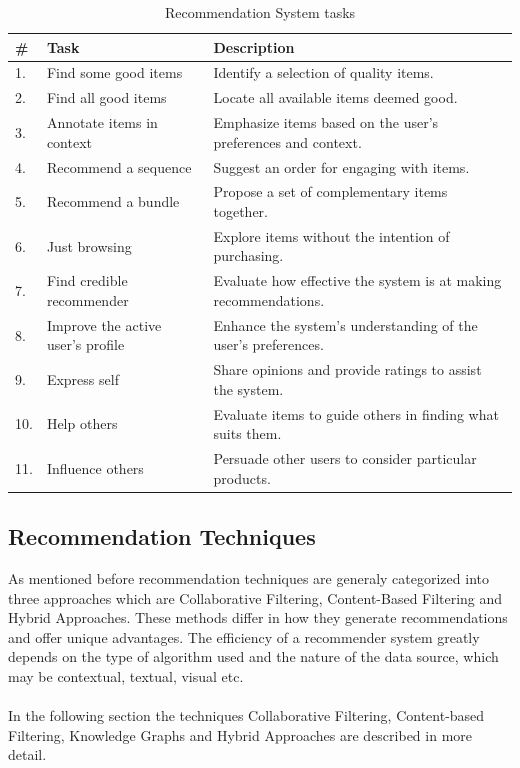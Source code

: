 \documentclass[\myFontSize,a4paper,oneside,english,hidelinks]{article}
\begin{document}
\begin{table}[h!]
\centering
{
\renewcommand{\arraystretch}{2}
{\large
\begin{tabular}{|m{}|m{}|m{}|}
\hline
\textbf{\#} & \textbf{Task} & \textbf{Description} \\ \hline
1. & Find some good items & Identify a selection of quality items. \\ \hline
2. & Find all good items & Locate all available items deemed good. \\ \hline
3. & Annotate items in context & Emphasize items based on the user's preferences and context. \\ \hline
4. & Recommend a sequence & Suggest an order for engaging with items. \\ \hline
5. & Recommend a bundle & Propose a set of complementary items together. \\ \hline
6. & Just browsing & Explore items without the intention of purchasing. \\ \hline
7. & Find credible recommender & Evaluate how effective the system is at making recommendations. \\ \hline
8. & Improve the active user's profile & Enhance the system's understanding of the user's preferences. \\ \hline
9. & Express self & Share opinions and provide ratings to assist the system. \\ \hline
10. & Help others & Evaluate items to guide others in finding what suits them. \\ \hline
11. & Influence others & Persuade other users to consider particular products. \\ \hline
\end{tabular}
}
}
\caption{Recommendation System tasks}
\label{table:rs-tasks}
\end{table}

\clearpage

\subsection{Recommendation Techniques}
As mentioned before recommendation techniques are generaly categorized into three approaches which are Collaborative Filtering, Content-Based Filtering and Hybrid Approaches. These methods differ in how they generate recommendations and offer unique advantages. The efficiency of a recommender system greatly depends on the type of algorithm used and the nature of the data source, which may be contextual, textual, visual etc. \cite{Roy2022}\\\\
In the following section the techniques Collaborative Filtering, Content-based Filtering, Knowledge Graphs and Hybrid Approaches are described in more detail.\\
%
\end{document}
